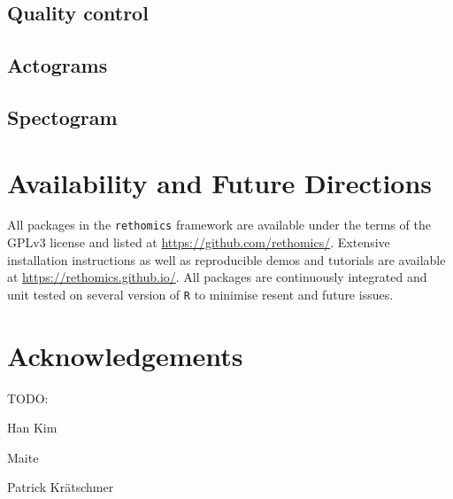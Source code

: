 \documentclass[10pt,letterpaper]{article}
\begin{document}
\subsection*{Quality control}

\subsection*{Actograms}


\subsection*{Spectogram}


\section*{Availability and Future Directions}
All packages in the \texttt{rethomics} framework are available under the terms of the GPLv3 license and listed at  		\href{https://github.com/rethomics}{https://github.com/rethomics/}.
Extensive installation instructions as well as reproducible demos and tutorials are available at
\href{https://rethomics.github.io/}{https://rethomics.github.io/}.
All packages are continuously integrated and unit tested on several version of \texttt{R} to minimise resent and future issues.


\section*{Acknowledgements}
TODO:

Han Kim

Maite

Patrick Kr{\"a}tschmer



\nolinenumbers

%
%
% 
\end{document}
